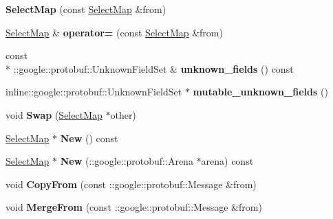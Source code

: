 \begin{DoxyCompactItemize}
\item 
\hypertarget{class_select_map_afd9bc662490deae5232f13cfe8d4d9c8}{{\bfseries Select\-Map} (const \hyperlink{class_select_map}{Select\-Map} \&from)}\label{class_select_map_afd9bc662490deae5232f13cfe8d4d9c8}

\item 
\hypertarget{class_select_map_a3fd80cd851c3d73a7a5fa5dfb7babb24}{\hyperlink{class_select_map}{Select\-Map} \& {\bfseries operator=} (const \hyperlink{class_select_map}{Select\-Map} \&from)}\label{class_select_map_a3fd80cd851c3d73a7a5fa5dfb7babb24}

\item 
\hypertarget{class_select_map_ac90998108757f6fe2e476840d7fa5ec7}{const \\*
\-::google\-::protobuf\-::\-Unknown\-Field\-Set \& {\bfseries unknown\-\_\-fields} () const }\label{class_select_map_ac90998108757f6fe2e476840d7fa5ec7}

\item 
\hypertarget{class_select_map_ae89a46b8b228f94ebfa4fdd8f5496a7e}{inline\-::google\-::protobuf\-::\-Unknown\-Field\-Set $\ast$ {\bfseries mutable\-\_\-unknown\-\_\-fields} ()}\label{class_select_map_ae89a46b8b228f94ebfa4fdd8f5496a7e}

\item 
\hypertarget{class_select_map_a03757f1100f5af311c7eff655204af8c}{void {\bfseries Swap} (\hyperlink{class_select_map}{Select\-Map} $\ast$other)}\label{class_select_map_a03757f1100f5af311c7eff655204af8c}

\item 
\hypertarget{class_select_map_ac0bab665ca3c3cf9d86d6fdb0dd0db6d}{\hyperlink{class_select_map}{Select\-Map} $\ast$ {\bfseries New} () const }\label{class_select_map_ac0bab665ca3c3cf9d86d6fdb0dd0db6d}

\item 
\hypertarget{class_select_map_a489354efbe2a4c1098a2d02ac2a2a0d2}{\hyperlink{class_select_map}{Select\-Map} $\ast$ {\bfseries New} (\-::google\-::protobuf\-::\-Arena $\ast$arena) const }\label{class_select_map_a489354efbe2a4c1098a2d02ac2a2a0d2}

\item 
\hypertarget{class_select_map_a63de092351e6415542de23769886fbea}{void {\bfseries Copy\-From} (const \-::google\-::protobuf\-::\-Message \&from)}\label{class_select_map_a63de092351e6415542de23769886fbea}

\item 
\hypertarget{class_select_map_aa8fb7854b32ca284e6eb9a95990d04a8}{void {\bfseries Merge\-From} (const \-::google\-::protobuf\-::\-Message \&from)}\label{class_select_map_aa8fb7854b32ca284e6eb9a95990d04a8}


\end{DoxyCompactItemize}
